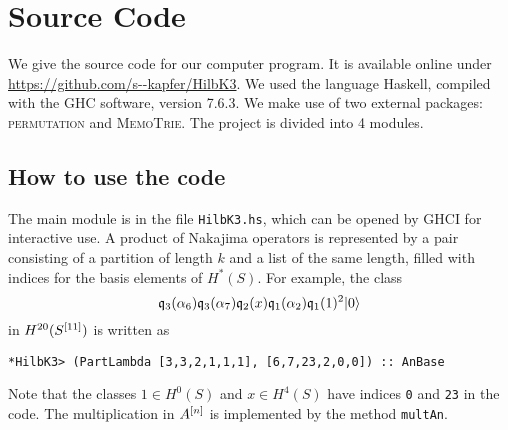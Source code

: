 \appendix
\section{Source Code}
We give the source code for our computer program. It is available online under \url{https://github.com/s--kapfer/HilbK3}. We used the language Haskell, compiled with the \textsc{GHC} software, version 7.6.3. We make use of two external packages: \textsc{permutation} and \textsc{MemoTrie}. The project is divided into 4 modules. 

\subsection{How to use the code}
The main module is in the file \verb|HilbK3.hs|, which can be opened by \textsc{GHCI} for interactive use. A product of Nakajima operators is represented by a pair consisting of a partition of length $k$ and a list of the same length, filled with indices for the basis elements of $H^*(S)$. For example, the class
$$
\mathfrak{q}_{3}(\alpha_6)\mathfrak{q}_{3}(\alpha_7)\mathfrak{q}_2(x)\mathfrak{q}_{1}(\alpha_2)\mathfrak{q}_{1}(1)^2 |0\rangle 
$$
in $H^{20}(S^{[11]})$ is written as
\begin{verbatim}
*HilbK3> (PartLambda [3,3,2,1,1,1], [6,7,23,2,0,0]) :: AnBase 
\end{verbatim}
Note that the classes $1\in H^0(S)$ and $x\in H^4(S)$ have indices \verb|0| and \verb|23| in the code.
The multiplication in $A^{[n]}$ is implemented by the method \verb|multAn|. 

